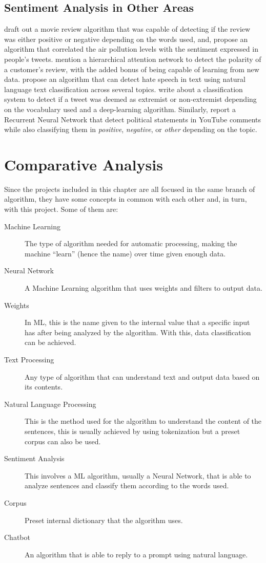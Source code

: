 \subsection{Sentiment Analysis in Other Areas}
\citet{rf5} draft out a movie review algorithm that was capable of detecting if the review was either positive or negative depending on the words used, and,
\citet{rf12} propose an algorithm that correlated the air pollution levels with the sentiment expressed in people's tweets.
\citet{rf13} mention a hierarchical attention network to detect the polarity of a customer's review, with the added bonus of being capable of learning from new data.
\citet{rf15} propose an algorithm that can detect hate speech in text using natural language text classification across several topics.
\citet{rf11} write about a classification system to detect if a tweet was deemed as extremist or non-extremist depending on the vocabulary used and a deep-learning algorithm. Similarly, \citet{rf16} report a Recurrent Neural Network that detect political statements in YouTube comments while also classifying them in \textit{positive}, \textit{negative}, or \textit{other} depending on the topic.

\section{Comparative Analysis}
Since the projects included in this chapter are all focused in the same branch of algorithm, they have some concepts in common with each other and, in turn, with this project. Some of them are:
\begin{description}
	\item[Machine Learning]{The type of algorithm needed for automatic processing, making the machine ``learn'' (hence the name) over time given enough data.}
	\item[Neural Network]{A Machine Learning algorithm that uses weights and filters to output data.}
	\item[Weights]{In ML, this is the name given to the internal value that a specific input has after being analyzed by the algorithm. With this, data classification can be achieved.}
	\item[Text Processing]{Any type of algorithm that can understand text and output data based on its contents.}
	\item[Natural Language Processing]{This is the method used for the algorithm to understand the content of the sentences, this is usually achieved by using tokenization but a preset corpus can also be used.}	
	\item[Sentiment Analysis]{This involves a ML algorithm, usually a Neural Network, that is able to analyze sentences and classify them according to the words used.}
	\item[Corpus]{Preset internal dictionary that the algorithm uses.}
	\item[Chatbot]{An algorithm that is able to reply to a prompt using natural language.}
\end{description}


